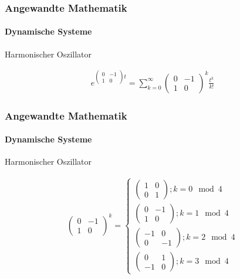 \documentclass{beamer}
\begin{document}
 \begin{frame}
    \frametitle{Angewandte Mathematik}
\framesubtitle{Dynamische Systeme }
\begin{block}{Harmonischer Oszillator}

\begin{align*}
 e^{ \begin{pmatrix}
        0 & -1  \\ 1 & 0
    \end{pmatrix} t } = \sum_{k= 0}^{\infty} \begin{pmatrix}
    0 & -1  \\ 1 & 0
\end{pmatrix}^{k} \frac{t^k}{k!} 
\end{align*}

\end{block}
 \end{frame}


 \begin{frame}
    \frametitle{Angewandte Mathematik}
\framesubtitle{Dynamische Systeme }
\begin{block}{Harmonischer Oszillator}

\begin{align*}
\begin{pmatrix}
        0 & -1  \\ 1 & 0
    \end{pmatrix}^{k}  = \begin{cases} 
        \begin{pmatrix}
            1 & 0  \\ 0 & 1
        \end{pmatrix}; k = 0 \mod 4 \\
        \begin{pmatrix}
            0 & -1  \\ 1 & 0
        \end{pmatrix}; k = 1 \mod 4 \\
        \begin{pmatrix}
            -1 & 0  \\ 0 & -1
        \end{pmatrix}; k = 2 \mod 4 \\
        \begin{pmatrix}
            0 & 1  \\ -1 & 0
        \end{pmatrix}; k = 3 \mod 4
    \end{cases}
\end{align*}
\end{block}
 \end{frame}
\end{document}
